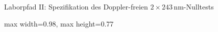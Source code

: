 \documentclass[aspectratio=169,10pt]{beamer}
\begin{document}
\begin{frame}[t]{Laborpfad II: Spezifikation des Doppler-freien $2 \times 243$\,nm-Nulltests}
\begin{center}
\begin{adjustbox}{max width=0.98\textwidth, max height=0.77\textheight}
\begin{tikzpicture}
        \end{tikzpicture}
        \end{adjustbox}
    \end{center}
\end{frame}
\end{document}
